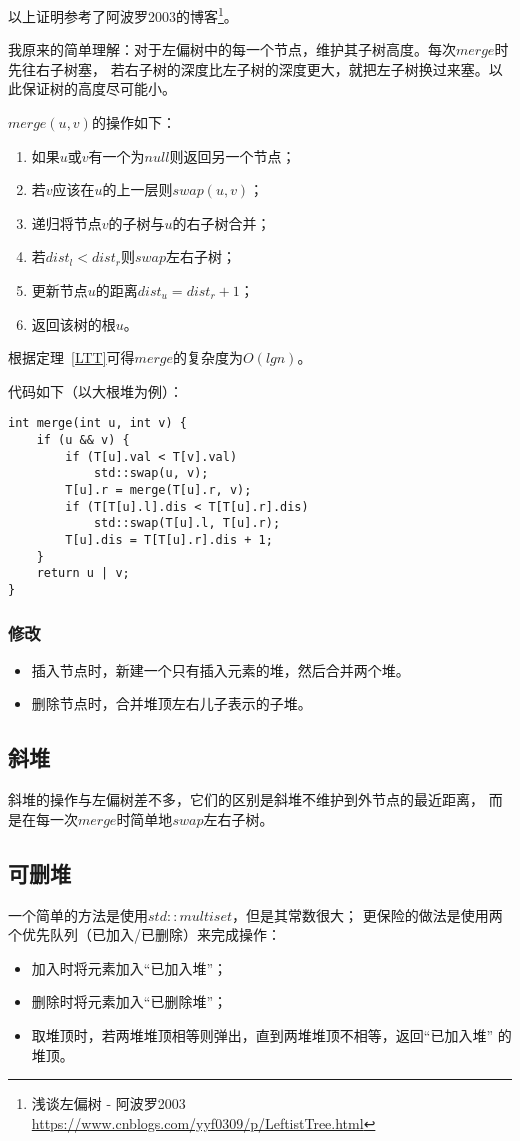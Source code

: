 以上证明参考了阿波罗2003的博客\footnote{
    浅谈左偏树 - 阿波罗2003
    \url{https://www.cnblogs.com/yyf0309/p/LeftistTree.html}
}。

我原来的简单理解：对于左偏树中的每一个节点，维护其子树高度。每次$merge$时先往右子树塞，
若右子树的深度比左子树的深度更大，就把左子树换过来塞。以此保证树的高度尽可能小。

$merge(u,v)$的操作如下：

\begin{enumerate}
    \item 如果$u$或$v$有一个为$null$则返回另一个节点；
    \item 若$v$应该在$u$的上一层则$swap(u,v)$；
    \item 递归将节点$v$的子树与$u$的右子树合并；
    \item 若$dist_l<dist_r$则$swap$左右子树；
    \item 更新节点$u$的距离$dist_u=dist_r+1$；
    \item 返回该树的根$u$。
\end{enumerate}

根据定理~\ref{LTT}可得$merge$的复杂度为$O(lgn)$。

代码如下（以大根堆为例）：

\begin{lstlisting}[title=merge]
int merge(int u, int v) {
    if (u && v) {
        if (T[u].val < T[v].val)
            std::swap(u, v);
        T[u].r = merge(T[u].r, v);
        if (T[T[u].l].dis < T[T[u].r].dis)
            std::swap(T[u].l, T[u].r);
        T[u].dis = T[T[u].r].dis + 1;
    }
    return u | v;
}
\end{lstlisting}

\subsubsection{修改}
\begin{itemize}
    \item 插入节点时，新建一个只有插入元素的堆，然后合并两个堆。
    \item 删除节点时，合并堆顶左右儿子表示的子堆。
\end{itemize}

\subsection{斜堆}
斜堆的操作与左偏树差不多，它们的区别是斜堆不维护到外节点的最近距离，
而是在每一次$merge$时简单地$swap$左右子树。
\subsection{可删堆}\label{MultiSet}
一个简单的方法是使用$std::multiset$，但是其常数很大；
更保险的做法是使用两个优先队列（已加入/已删除）来完成操作：
\begin{itemize}
	\item 加入时将元素加入``已加入堆''；
	\item 删除时将元素加入``已删除堆''；
	\item 取堆顶时，若两堆堆顶相等则弹出，直到两堆堆顶不相等，返回``已加入堆''
	      的堆顶。
\end{itemize}
